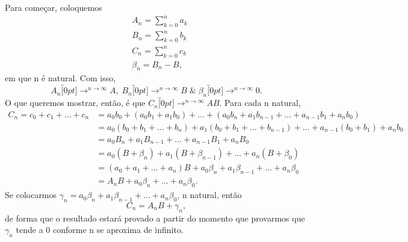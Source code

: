 \documentclass[../analysis_notes.tex]{subfiles}
\begin{document}
\begin{proof*}
	Para começar, coloquemos
	\begin{align*}
		 & A_{n}=\sum\limits_{k=0}^{n}a_{k} \\
		 & B_{n}=\sum\limits_{k=0}^{n}b_{k} \\
		 & C_{n}=\sum\limits_{k=0}^{n}c_{k} \\
		 & \beta_{n}=B_{n}-B,
	\end{align*}
	em que n é natural. Com isso,
	\[
		A_{n}\overbracket[0pt]{\longrightarrow}^{n\to \infty}A,\;B_{n}\overbracket[0pt]{\longrightarrow}^{n\to \infty}B \;\&\; \beta_{n}\overbracket[0pt]{\longrightarrow}^{n\to \infty}0.
	\]
	O que queremos mostrar, então, é que \(C_{n}\overbracket[0pt]{\longrightarrow}^{n\to \infty}AB.\) Para cada n natural,
	\begin{align*}
		C_{n}=c_{0}+c_{1}+\dotsc +c_{n} & = a_{0}b_{0}+(a_{0}b_{1}+a_{1}b_{0})+\dotsc +(a_{0}b_{n}+a_{1}b_{n-1}+\dotsc +a_{n-1}b_{1}+a_{n}b_{0})          \\
		                                & = a_{0}(b_{0}+b_{1}+ \dotsc +b_{n})+a_{1}(b_{0}+b_{1}+ \dotsc +b_{n-1})+\dotsc +a_{n-1}(b_{0}+b_{1})+a_{n}b_{0} \\
		                                & = a_{0}B_{n}+a_{1}B_{n-1}+\dotsc +a_{n-1}B_{1}+a_{n}B_{0}                                                       \\
		                                & =a_{0}(B+\beta_{n})+a_{1}(B+\beta_{n-1})+\dotsc +a_{n}(B+\beta_{0})                                             \\
		                                & =(a_{0}+a_{1}+\dotsc +a_{n})B + a_{0}\beta_{n}+a_{1}\beta_{n-1}+\dotsc +a_{n}\beta_{0}                          \\
		                                & =A_{n}B+a_{0}\beta_{n}+\dotsc +a_{n}\beta_{0}.
	\end{align*}
	Se colocarmos \(\gamma_{n}=a_{0}\beta_{n}+a_{1}\beta_{n-1}+\dotsc +a_{n}\beta_{0}\), n natural, então
	\[
		C_{n}=A_{n}B+\gamma_{n},
	\]
	de forma que o resultado estará provado a partir do momento que provarmos que \(\gamma_{n}\) tende a 0 conforme n se aproxima de infinito.


\end{proof*}
\end{document}

